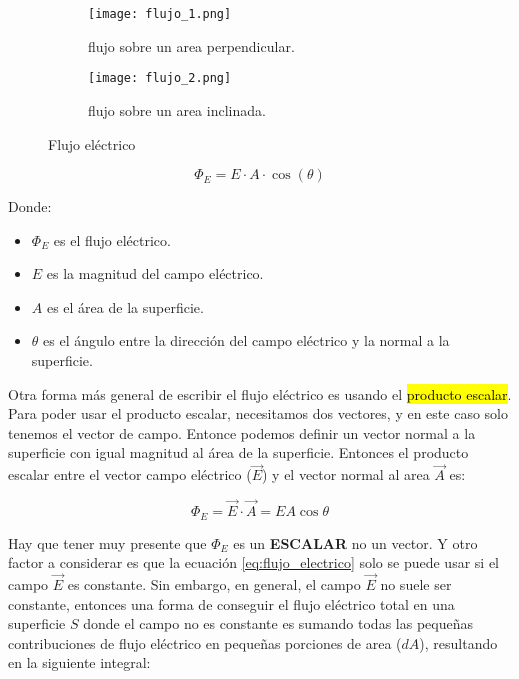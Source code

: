 \begin{figure}[ht!]
    \centering
    \begin{subfigure}[b]{0.45\textwidth}
        \centering
        \texttt{[image: flujo\_1.png]}
        \caption{flujo sobre un area perpendicular.}
        \label{fig:flujo1}
    \end{subfigure}
    \hfill
    \begin{subfigure}[b]{0.45\textwidth}
        \centering
        \texttt{[image: flujo\_2.png]}
        \caption{flujo sobre un area inclinada.}
        \label{fig:flujo2}
    \end{subfigure}
    \caption{Flujo eléctrico}
    \label{fig:flujo eléctrico}
\end{figure}

\[
\Phi_E = E \cdot A \cdot \cos(\theta)
\]

Donde:
\begin{itemize}
    \item \(\Phi_E\) es el flujo eléctrico.
    \item \(E\) es la magnitud del campo eléctrico.
    \item \(A\) es el área de la superficie.
    \item \(\theta\) es el ángulo entre la dirección del campo eléctrico y la normal a la superficie.
\end{itemize}

Otra forma más general de escribir el flujo eléctrico es usando el \hl{producto escalar}. Para poder usar el producto escalar, necesitamos dos vectores, y en este caso solo tenemos el vector de campo. Entonce podemos definir un vector normal a la superficie con igual magnitud al área de la superficie. Entonces el producto escalar entre el vector campo eléctrico (\(\vec{E}\)) y el vector normal al area \(\vec{A}\) es:

\begin{equation}
    \Phi_E = \vec{E} \cdot \vec{A} = E A \cos \theta
    \label{eq:flujo_electrico}
\end{equation}

Hay que tener muy presente que \(\Phi_E\) es un \textbf{ESCALAR} no un vector. Y otro factor a considerar es que la ecuación \eqref{eq:flujo_electrico} solo se puede usar si el campo \(\vec{E}\) es constante. Sin embargo, en general, el campo \(\vec{E}\) no suele ser constante, entonces una forma de conseguir el flujo eléctrico total en una superficie \(S\) donde el campo no es constante es sumando todas las pequeñas contribuciones de flujo eléctrico en pequeñas porciones de area (\(dA\)), resultando en la siguiente integral:

